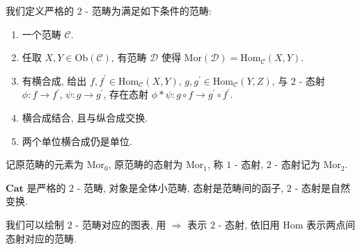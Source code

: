 \begin{definition}
    我们定义严格的 \(2\) - 范畴为满足如下条件的范畴:

    \begin{enumerate}
        \item 一个范畴 \(\mathcal{C}\).
        \item 任取 \(X,Y \in \mathrm{Ob} (\mathcal{C})\), 有范畴 \(\mathcal{D}\) 使得 \(\mathrm{Mor} (\mathcal{D}) = \mathrm{Hom}_\mathcal{C} (X,Y)\).
        \item 有横合成, 给出 \(f, f^\prime \in \mathrm{Hom}_\mathcal{C} (X,Y)\), \(g, g^\prime \in \mathrm{Hom}_\mathcal{C} (Y,Z)\), 与
                \(2\) - 态射 \(\phi : f \to f^\prime\), \(\psi : g \to g^\prime\), 存在态射 \(\phi \ast \psi : g \circ f \to g^\prime \circ f^\prime\).
        \item 横合成结合, 且与纵合成交换.
        \item 两个单位横合成仍是单位.
    \end{enumerate}
\end{definition}

记原范畴的元素为 \(\mathrm{Mor}_0\), 原范畴的态射为 \(\mathrm{Mor}_1\), 称 \(1\) - 态射, \(2\) - 态射记为 \(\mathrm{Mor}_2\).

\begin{example}
    \(\mathbf{Cat}\) 是严格的 \(2\) - 范畴, 对象是全体小范畴, 态射是范畴间的函子, \(2\) - 态射是自然变换.
\end{example}

我们可以绘制 \(2\) - 范畴对应的图表, 用 \(\Rightarrow\) 表示 \(2\) - 态射, 依旧用 \(\mathrm{Hom}\) 表示两点间态射对应的范畴.

